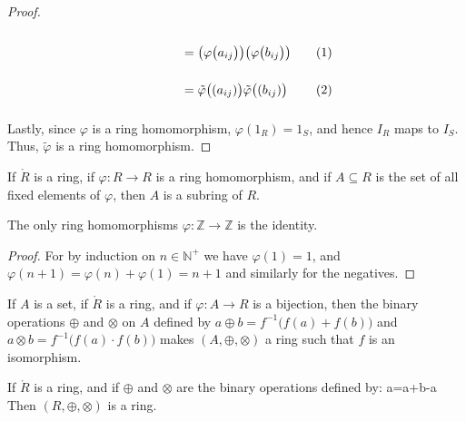 \begin{proof}
\begin{subequations}
\begin{minipage}[t]{0.44\textwidth}
\begin{align}
                            &=\big(\varphi\big(a_{ij}\big)\big)
                                \big(\varphi\big(b_{ij}\big)\big)
                                \vphantom{\Big(\sum_{k\in\mathbb{Z}_{n}}}\\
                            &=\tilde{\varphi}\big((a_{ij})\big)
                                \tilde{\varphi}\big((b_{ij})\big)
                                \vphantom{\Big(\sum_{k\in\mathbb{Z}_{n}}}
                        \end{align}
                    \end{minipage}
                \end{subequations}
                Lastly, since $\varphi$ is a ring homomorphism,
                $\varphi(1_{R})=1_{S}$, and hence $I_{R}$ maps to $I_{S}$.
                Thus, $\tilde{\varphi}$ is a ring homomorphism.
            \end{proof}
            \begin{theorem}
                If $\ring{R}$ is a ring, if $\varphi:R\rightarrow{R}$ is a
                ring homomorphism, and if $A\subseteq{R}$ is the set of all
                fixed elements of $\varphi$, then $A$ is a subring of $R$.
            \end{theorem}
            \begin{theorem}
                The only ring homomorphisms
                $\varphi:\mathbb{Z}\rightarrow\mathbb{Z}$ is the identity.
            \end{theorem}
            \begin{proof}
                For by induction on $n\in\mathbb{N}^{+}$ we have
                $\varphi(1)=1$, and $\varphi(n+1)=\varphi(n)+\varphi(1)=n+1$
                and similarly for the negatives.
            \end{proof}
            \begin{theorem}
                If $A$ is a set, if $\ring{R}$ is a ring, and if
                $\varphi:A\rightarrow{R}$ is a bijection, then the binary
                operations $\oplus$ and $\otimes$ on $A$ defined by
                $a\oplus{b}=f^{\minus{1}}\big(f(a)+f(b)\big)$ and
                $a\otimes{b}=f^{\minus{1}}\big(f(a)\cdot{f}(b)\big)$ makes
                $(A,\oplus,\otimes)$ a ring such that $f$ is an isomorphism.
            \end{theorem}
            \begin{theorem}
                If $\ring{R}$ is a ring, and if $\oplus$ and $\otimes$ are
                the binary operations defined by:
                            {a=a+b-a}
                Then $(R,\oplus,\otimes)$ is a ring.
            \end{theorem}
